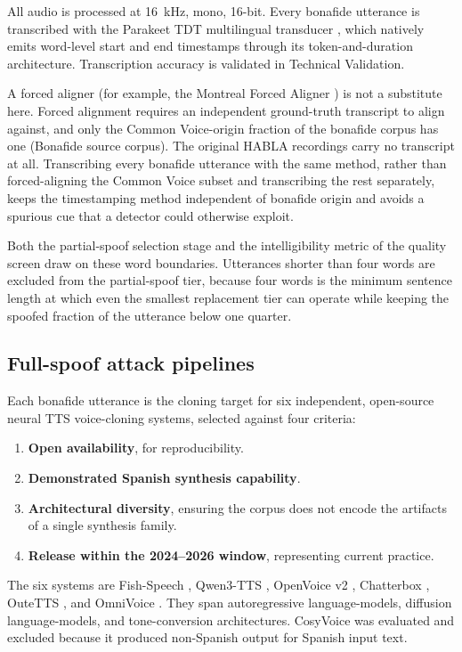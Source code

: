 \documentclass[11pt]{article}
\begin{document}
All audio is processed at \SI{16}{\kilo\hertz}, mono, 16-bit. Every bonafide utterance is transcribed with the Parakeet TDT multilingual transducer \citep{tdt,parakeet}, which natively emits word-level start and end timestamps through its token-and-duration architecture. Transcription accuracy is validated in Technical Validation.

A forced aligner (for example, the Montreal Forced Aligner \citep{mfa}) is not a substitute here. Forced alignment requires an independent ground-truth transcript to align against, and only the Common Voice-origin fraction of the bonafide corpus has one (Bonafide source corpus). The original HABLA recordings carry no transcript at all. Transcribing every bonafide utterance with the same method, rather than forced-aligning the Common Voice subset and transcribing the rest separately, keeps the timestamping method independent of bonafide origin and avoids a spurious cue that a detector could otherwise exploit.

Both the partial-spoof selection stage and the intelligibility metric of the quality screen draw on these word boundaries.
Utterances shorter than four words are excluded from the partial-spoof tier, because four words is the minimum sentence length at which even the smallest replacement tier can operate while keeping the spoofed fraction of the utterance below one quarter.

\subsection*{Full-spoof attack pipelines}

Each bonafide utterance is the cloning target for six independent,
open-source neural TTS voice-cloning systems, selected against four
criteria:
\begin{enumerate}
  \item \textbf{Open availability}, for reproducibility.
  \item \textbf{Demonstrated Spanish synthesis capability}.
  \item \textbf{Architectural diversity}, ensuring the corpus does not
  encode the artifacts of a single synthesis family.
  \item \textbf{Release within the 2024--2026 window}, representing
  current practice.
\end{enumerate}
The six systems are Fish-Speech \citep{fishspeech}, Qwen3-TTS
\citep{qwen3tts}, OpenVoice v2 \citep{openvoice}, Chatterbox
\citep{chatterbox}, OuteTTS \citep{outetts}, and OmniVoice
\citep{omnivoice}. They span autoregressive language-models, diffusion
language-models, and tone-conversion architectures. CosyVoice
\citep{cosyvoice} was evaluated and excluded because it produced
non-Spanish output for Spanish input text.
\end{document}
